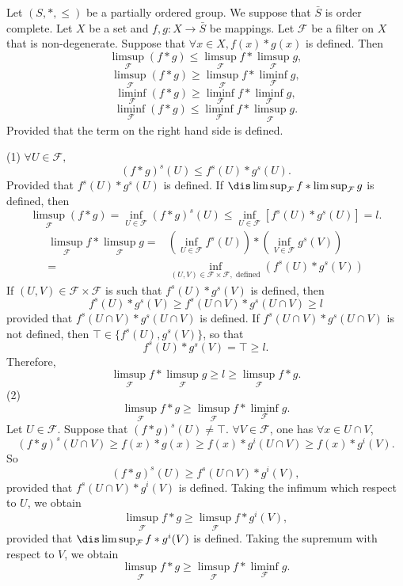 \begin{theoremenv}
    Let $(S,*,\le)$ be a partially ordered group. We suppose that $\bar{S}$ is order complete. Let $X$ be a set and 
    $f,g:X\longrightarrow \bar{S}$ be mappings. Let $\mathcal{F}$ be a filter on $X$ that is non-degenerate. Suppose that $\forall x\in X, f(x)*g(x)$ is defined. Then 
    $$\limsup_{\mathcal{F}}(f*g)\le \limsup_{\mathcal{F}}f*\limsup_{\mathcal{F}}g,$$
    $$\limsup_{\mathcal{F}}(f*g)\ge \limsup_{\mathcal{F}}f*\liminf_{\mathcal{F}}g,$$
    $$\liminf_{\mathcal{F}}(f*g)\ge \liminf_{\mathcal{F}}f*\liminf_{\mathcal{F}}g,$$
    $$\liminf_{\mathcal{F}}(f*g)\le \liminf_{\mathcal{F}}f*\limsup_{\mathcal{F}}g.$$
    Provided that the term on the right hand side is defined.

\end{theoremenv}
\begin{proofenv}
    \quad\newline
    (1) $\forall U\in\mathcal{F},$
    $$(f*g)^s(U)\le f^s(U)*g^s(U).$$
    Provided that $f^s(U)* g^s(U)$ is defined.
    If $\dis \limsup_{\mathcal{F}}f*\limsup_{\mathcal{F}}g$ is defined, then 
    $$\limsup _{\mathcal{F}}(f*g)=\inf_{U\in \mathcal{F}}(f*g)^s(U)\le \inf_{U\in \mathcal{F}}\left[f^s(U)*g^s(U)\right]=l.$$
\begin{align*}
\limsup_{\mathcal{F}}f*\limsup_{\mathcal{F}}g=&\left(\inf_{U\in \mathcal{F}}f^s(U)\right)*\left(\inf_{V\in\mathcal{F}}g^s(V)\right)\\
=&\inf_{(U,V)\in \mathcal{F}\times\mathcal{F},\text{ defined}}\left(f^s(U)*g^s(V)\right)
\end{align*}
If $(U,V)\in \mathcal{F}\times\mathcal{F}$ is such that $f^s(U)*g^s(V)$ is defined, then 
$$f^s(U)* g^s(V)\ge f^s(U\cap V)*g^s(U\cap V)\ge l$$
provided that $f^s(U\cap V)*g^s(U\cap V)$ is defined.
If $f^s(U\cap V)*g^s(U\cap V)$ is not defined, then $\top\in\{f^s(U),g^s(V)\}$, so that 
$$f^s(U)*g^s(V)=\top \ge l.$$
Therefore, $$\limsup_{\mathcal{F}}f*\limsup_{\mathcal{F}}g\ge l\ge \limsup_{\mathcal{F}}f*g.$$
(2) $$\limsup_{\mathcal{F}}f*g\ge \limsup_\mathcal{F}f *\liminf_\mathcal{F}g.$$
Let $U\in\mathcal{F}$. Suppose that $\left(f*g\right)^s(U)\not=\top$. $\forall V\in \mathcal{F}$, one has $\forall x\in U\cap V$,
$$\left(f*g\right)^s(U\cap V)\ge f(x)*g(x)\ge f(x)*g^i(U\cap V)\ge f(x)*g^i(V).$$
So $$\left(f*g\right)^s(U)\ge f^s(U\cap V)*g^i(V),$$
provided that $f^s(U\cap V)*g^i(V)$ is defined. Taking the infimum which respect to $U$, we obtain
$$\limsup_{\mathcal{F}}f*g\ge \limsup_{\mathcal{F}}f*g^i(V),$$
provided that $\dis \limsup_{\mathcal{F}}f*g^i(V)$ is defined. Taking the supremum with respect to $V$, we obtain
$$\limsup_{\mathcal{F}}f*g\ge \limsup_{\mathcal{F}}f*\liminf_{\mathcal{F}}g.$$
\end{proofenv}
